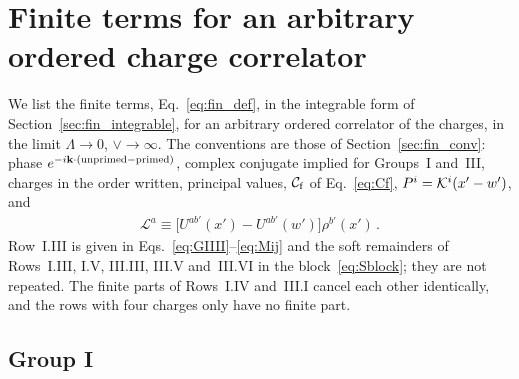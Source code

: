 \begingroup\sloppy
\section{Finite terms for an arbitrary ordered charge correlator}\label{app:finite}

We list the finite terms, Eq.~\eqref{eq:fin_def}, in the integrable form of Section~\ref{sec:fin_integrable}, for an arbitrary ordered correlator of the charges, in the limit $\Lambda\to0$, $\vee\to\infty$. The conventions are those of Section~\ref{sec:fin_conv}: phase $e^{-i\mathbf{k}\cdot(\text{unprimed}-\text{primed})}$, complex conjugate implied for Groups~I and~III, charges in the order written, principal values, $\mathcal C_{\rm f}$ of Eq.~\eqref{eq:Cf}, $P^i=\mathcal{K}^i(x'-w')$, and
\begin{align}
\mathcal L^a\equiv\big[U^{ab'}(x')-U^{ab'}(w')\big]\rho^{b'}(x')\,.
\end{align}
Row~I.III is given in Eqs.~\eqref{eq:GIIII}--\eqref{eq:Mij} and the soft remainders of Rows~I.III, I.V, III.III, III.V and~III.VI in the block~\eqref{eq:Sblock}; they are not repeated. The finite parts of Rows~I.IV and~III.I cancel each other identically, and the rows with four charges only have no finite part.

\subsection{Group I}

